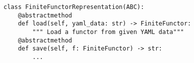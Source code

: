 \begin{verbatim}
class FiniteFunctorRepresentation(ABC):
    @abstractmethod
    def load(self, yaml_data: str) -> FiniteFunctor:
        """ Load a functor from given YAML data"""
    @abstractmethod
    def save(self, f: FiniteFunctor) -> str:
        ...
\end{verbatim}